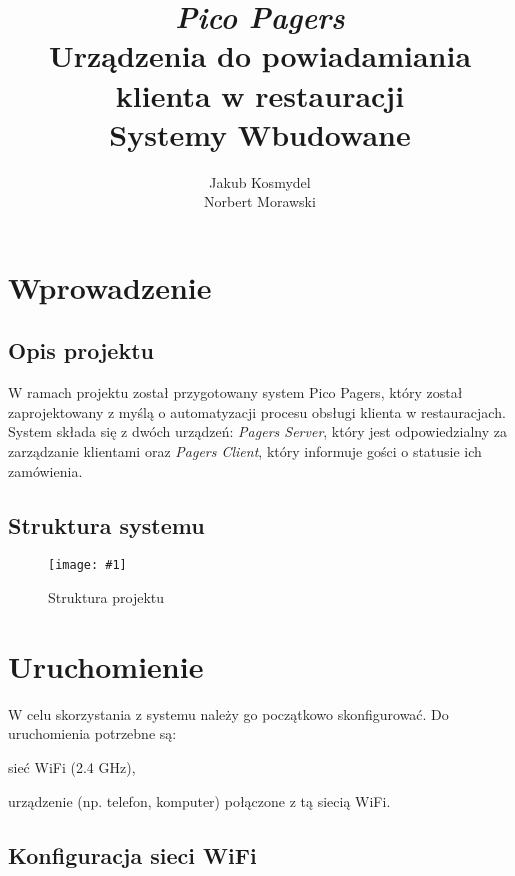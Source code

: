 \documentclass[12pt]{article}
\let\tempone\itemize
\let\temptwo\enditemize
\renewenvironment{itemize}{\tempone\setlength{\itemsep}{0cm}}{\temptwo}
\newcommand{\imgcustomsize}[3]{
	\begin{figure}[H]
		\centering
		\texttt{[image: \#1]}
		\caption{#2}
	\end{figure}
}
\newcommand{\img}[2]{\imgcustomsize{#1}{#2}{0.8}}
\begin{document}
	
	\title{\textit{Pico Pagers} \\ Urządzenia do powiadamiania klienta w restauracji \\
		\vspace{0.2cm}
		\large Systemy Wbudowane}
	\author{Jakub Kosmydel \\
		Norbert Morawski}
	
	\maketitle
	\tableofcontents
	\pagebreak
	
	
	\section{Wprowadzenie}
    \subsection{Opis projektu}
		W ramach projektu został przygotowany system Pico Pagers, który został zaprojektowany z myślą o automatyzacji procesu obsługi klienta w restauracjach. System składa się z dwóch urządzeń: \emph{Pagers Server}, który jest odpowiedzialny za zarządzanie klientami oraz \emph{Pagers Client}, który informuje gości o statusie ich zamówienia.
    \subsection{Struktura systemu}
    \img{graphs/structure}{Struktura projektu}

    \section{Uruchomienie}
        W celu skorzystania z systemu należy go początkowo skonfigurować. Do uruchomienia potrzebne są:
        \begin{itemize}
            \item sieć WiFi (2.4 GHz),
            \item urządzenie (np. telefon, komputer) połączone z tą siecią WiFi.
        \end{itemize}
        \subsection{Konfiguracja sieci WiFi}
\end{document}
